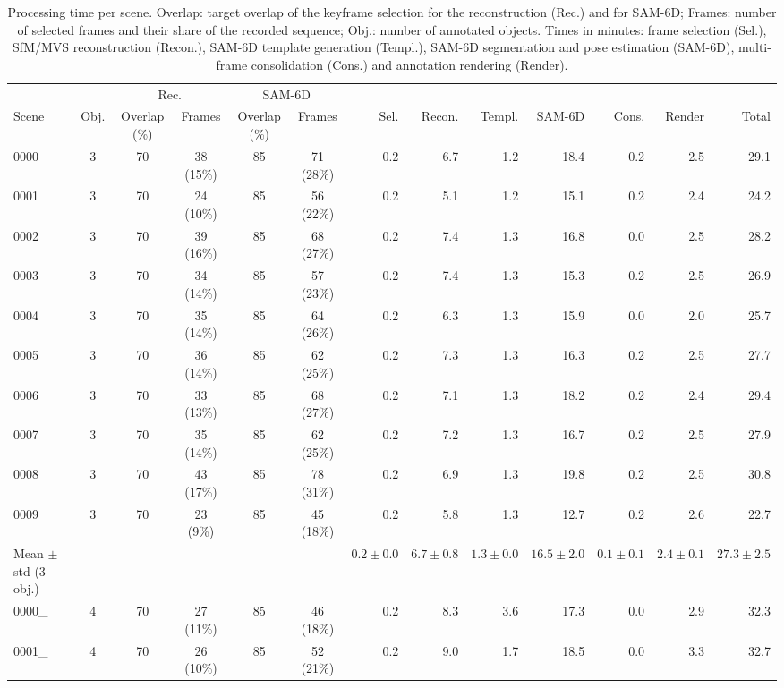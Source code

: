 \begin{table}[t]
\centering
\small
\caption{Processing time per scene. Overlap: target overlap of the keyframe selection for the reconstruction (Rec.) and for SAM-6D; Frames: number of selected frames and their share of the recorded sequence; Obj.: number of annotated objects. Times in minutes: frame selection (Sel.), SfM/MVS reconstruction (Recon.), SAM-6D template generation (Templ.), SAM-6D segmentation and pose estimation (SAM-6D), multi-frame consolidation (Cons.) and annotation rendering (Render).}
\label{tab:runtime_scenes}
\begin{tabular}{lcccccrrrrrrr}
\hline
 & & \multicolumn{2}{c}{Rec.} & \multicolumn{2}{c}{SAM-6D} & & & & & & & \\
Scene & Obj. & Overlap (\%) & Frames & Overlap (\%) & Frames & Sel. & Recon. & Templ. & SAM-6D & Cons. & Render & Total \\
\hline
0000 & 3 & 70 & 38 (15\%) & 85 & 71 (28\%) & 0.2 & 6.7 & 1.2 & 18.4 & 0.2 & 2.5 & 29.1 \\
0001 & 3 & 70 & 24 (10\%) & 85 & 56 (22\%) & 0.2 & 5.1 & 1.2 & 15.1 & 0.2 & 2.4 & 24.2 \\
0002 & 3 & 70 & 39 (16\%) & 85 & 68 (27\%) & 0.2 & 7.4 & 1.3 & 16.8 & 0.0 & 2.5 & 28.2 \\
0003 & 3 & 70 & 34 (14\%) & 85 & 57 (23\%) & 0.2 & 7.4 & 1.3 & 15.3 & 0.2 & 2.5 & 26.9 \\
0004 & 3 & 70 & 35 (14\%) & 85 & 64 (26\%) & 0.2 & 6.3 & 1.3 & 15.9 & 0.0 & 2.0 & 25.7 \\
0005 & 3 & 70 & 36 (14\%) & 85 & 62 (25\%) & 0.2 & 7.3 & 1.3 & 16.3 & 0.2 & 2.5 & 27.7 \\
0006 & 3 & 70 & 33 (13\%) & 85 & 68 (27\%) & 0.2 & 7.1 & 1.3 & 18.2 & 0.2 & 2.4 & 29.4 \\
0007 & 3 & 70 & 35 (14\%) & 85 & 62 (25\%) & 0.2 & 7.2 & 1.3 & 16.7 & 0.2 & 2.5 & 27.9 \\
0008 & 3 & 70 & 43 (17\%) & 85 & 78 (31\%) & 0.2 & 6.9 & 1.3 & 19.8 & 0.2 & 2.5 & 30.8 \\
0009 & 3 & 70 & 23 (9\%) & 85 & 45 (18\%) & 0.2 & 5.8 & 1.3 & 12.7 & 0.2 & 2.6 & 22.7 \\
\hline
Mean $\pm$ std (3 obj.) & & & & & & $0.2 \pm 0.0$ & $6.7 \pm 0.8$ & $1.3 \pm 0.0$ & $16.5 \pm 2.0$ & $0.1 \pm 0.1$ & $2.4 \pm 0.1$ & $27.3 \pm 2.5$ \\
\hline
0000\_ & 4 & 70 & 27 (11\%) & 85 & 46 (18\%) & 0.2 & 8.3 & 3.6 & 17.3 & 0.0 & 2.9 & 32.3 \\
0001\_ & 4 & 70 & 26 (10\%) & 85 & 52 (21\%) & 0.2 & 9.0 & 1.7 & 18.5 & 0.0 & 3.3 & 32.7 \\

\end{tabular}
\end{table}
